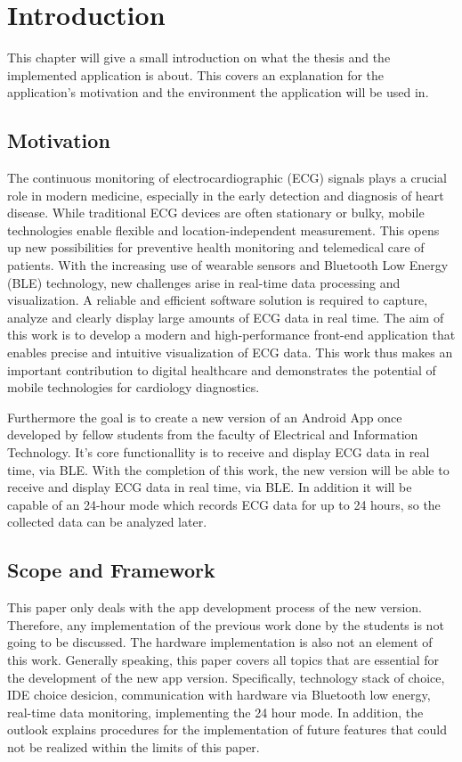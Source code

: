\section{Introduction}
\label{key}
\onehalfspacing
{\large This chapter will give a small introduction on what the thesis and the implemented
	application is about. This covers an explanation for the application’s motivation and
	the environment the application will be used in.}


\subsection{Motivation}
{\large 
	
	The continuous monitoring of electrocardiographic (ECG) signals plays a crucial role in modern medicine, especially in the early detection and diagnosis of heart disease. While traditional ECG devices are often stationary or bulky, mobile technologies enable flexible and location-independent measurement. This opens up new possibilities for preventive health monitoring and telemedical care of patients.
	With the increasing use of wearable sensors and Bluetooth Low Energy (BLE) technology, new challenges arise in real-time data processing and visualization. A reliable and efficient software solution is required to capture, analyze and clearly display large amounts of ECG data in real time.
	The aim of this work is to develop a modern and high-performance front-end application that enables precise and intuitive visualization of ECG data.  This work thus makes an important contribution to digital healthcare and demonstrates the potential of mobile technologies for cardiology diagnostics.

	Furthermore the goal  is to  create a new version of an Android App once developed by fellow students from the faculty of Electrical and Information Technology. It's core functionallity is to receive and display ECG data in real time, via BLE. With the completion of this work, the new version will be able to receive and display ECG data in real time, via BLE. In addition it will be capable of an 24-hour mode which records ECG data for up to 24 hours, so the collected data can be analyzed later.
}
\subsection{Scope and Framework}
{\large
	This paper only deals with the app development process of the new version. Therefore, any implementation of the previous work done by the students is not going to be discussed. The hardware implementation is also not an element of this work. Generally speaking, this paper covers all topics that are essential for the development of the new app version. Specifically, technology stack of choice, IDE choice desicion, communication with hardware via Bluetooth low energy, real-time data monitoring, implementing the 24 hour mode.  In addition, the outlook explains procedures for the implementation of future features that could not be realized within the limits of this paper.
		
}
